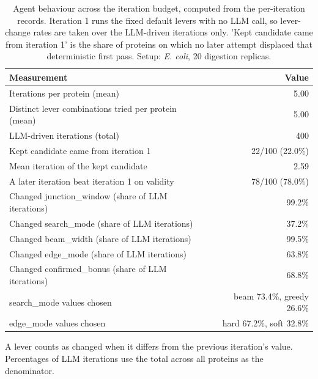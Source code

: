 \begin{table}[!tb]
  \centering
  \caption{Agent behaviour across the iteration budget, computed from the per-iteration records. Iteration 1 runs the fixed default levers with no LLM call, so lever-change rates are taken over the LLM-driven iterations only. 'Kept candidate came from iteration 1' is the share of proteins on which no later attempt displaced that deterministic first pass. Setup: \textnormal{\textnormal{\textit{E. coli}}}, 20 digestion replicas.}
  \label{tab:agent_behaviour_ecoli_r20}
  \begin{tabular}{lr}
    \toprule
    Measurement & Value \\
    \midrule
    Iterations per protein (mean) & 5.00 \\
    Distinct lever combinations tried per protein (mean) & 5.00 \\
    LLM-driven iterations (total) & 400 \\
    Kept candidate came from iteration 1 & 22/100 (22.0\%) \\
    Mean iteration of the kept candidate & 2.59 \\
    A later iteration beat iteration 1 on validity & 78/100 (78.0\%) \\
    Changed junction\_window (share of LLM iterations) & 99.2\% \\
    Changed search\_mode (share of LLM iterations) & 37.2\% \\
    Changed beam\_width (share of LLM iterations) & 99.5\% \\
    Changed edge\_mode (share of LLM iterations) & 63.8\% \\
    Changed confirmed\_bonus (share of LLM iterations) & 68.8\% \\
    search\_mode values chosen & beam 73.4\%, greedy 26.6\% \\
    edge\_mode values chosen & hard 67.2\%, soft 32.8\% \\
    \bottomrule
  \end{tabular}
  \par\smallskip\footnotesize{A lever counts as changed when it differs from the previous iteration's value. Percentages of LLM iterations use the total across all proteins as the denominator.}
\end{table}
